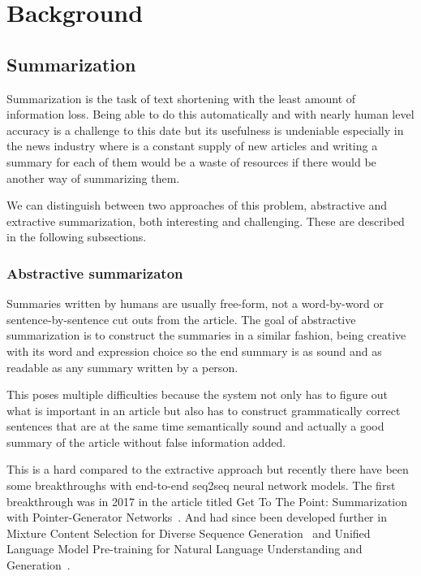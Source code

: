 \chapter{Background}\label{sect:Background}
\section{Summarization}
Summarization is the task of text shortening with the least amount of information loss. Being able to do this automatically and with nearly human level accuracy is a challenge to this date but its usefulness is undeniable especially in the news industry where is a constant supply of new articles and writing a summary for each of them would be a waste of resources if there would be another way of summarizing them.

We can distinguish between two approaches of this problem, abstractive and extractive summarization, both interesting and challenging. These are described in the following subsections.

\subsection{Abstractive summarizaton}
Summaries written by humans are usually free-form, not a word-by-word or sentence-by-sentence cut outs from the article. The goal of abstractive summarization is to construct the summaries in a similar fashion, being creative with its word and expression choice so the end summary is as sound and as readable as any summary written by a person.

This poses multiple difficulties because the system not only has to figure out what is important in an article but also has to construct grammatically correct sentences that are at the same time semantically sound and actually a good summary of the article without false information added.

This is a hard compared to the extractive approach but recently there have been some breakthroughs with end-to-end seq2seq neural network models. The first breakthrough was in 2017 in the article titled Get To The Point: Summarization with Pointer-Generator Networks~\cite{AbstractiveSum}. And had since been developed further in Mixture Content Selection for Diverse Sequence Generation~\cite{DiverseAbstract} and Unified Language Model Pre-training for Natural Language Understanding and Generation~\cite{UniLM}.

